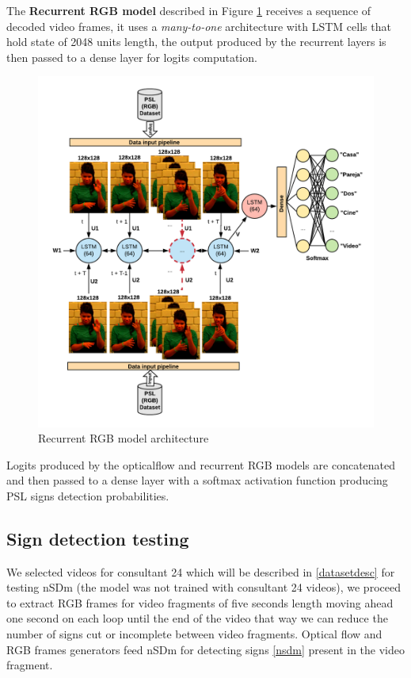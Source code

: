 \documentclass[twocolumn,conference]{article}
\begin{document}
The \textbf{Recurrent RGB model} described in Figure \ref{fig:rgb-architecture} receives a sequence of decoded video frames, it uses a \textit{many-to-one} architecture with LSTM cells that hold state of 2048 units length, the output produced by the recurrent layers is then passed to a dense layer for logits computation.

\begin{figure}[hbt!]
\includegraphics[width=\linewidth]{images/recurrent-rgb-model-architecture.png}
\caption{Recurrent RGB model architecture}
\label{fig:rgb-architecture}
\end{figure}

Logits produced by the opticalflow and recurrent RGB models are concatenated and then passed to a dense layer with a softmax activation function producing PSL signs detection probabilities.

\subsection{Sign detection testing}\label{new-videos-testing}
We selected videos for consultant 24 which will be described in \ref{datasetdesc} for testing nSDm (the model was not trained with consultant 24 videos), we proceed to extract RGB frames for video fragments of five seconds length moving ahead one second on each loop until the end of the video that way we can reduce the number of signs cut or incomplete between video fragments. Optical flow and RGB frames generators feed nSDm for detecting signs \ref{nsdm} present in the video fragment.
\end{document}

